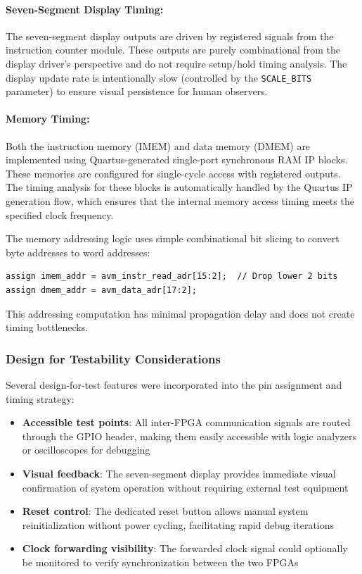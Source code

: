 \documentclass[12pt]{article}
\begin{document}
\paragraph{Seven-Segment Display Timing:}
The seven-segment display outputs are driven by registered signals from the instruction counter module. These outputs are purely combinational from the display driver's perspective and do not require setup/hold timing analysis. The display update rate is intentionally slow (controlled by the \texttt{SCALE\_BITS} parameter) to ensure visual persistence for human observers.

\paragraph{Memory Timing:}
Both the instruction memory (IMEM) and data memory (DMEM) are implemented using Quartus-generated single-port synchronous RAM IP blocks. These memories are configured for single-cycle access with registered outputs. The timing analysis for these blocks is automatically handled by the Quartus IP generation flow, which ensures that the internal memory access timing meets the specified clock frequency.

The memory addressing logic uses simple combinational bit slicing to convert byte addresses to word addresses:
\begin{verbatim}
assign imem_addr = avm_instr_read_adr[15:2];  // Drop lower 2 bits
assign dmem_addr = avm_data_adr[17:2];
\end{verbatim}

This addressing computation has minimal propagation delay and does not create timing bottlenecks.

\subsubsection{Design for Testability Considerations}

Several design-for-test features were incorporated into the pin assignment and timing strategy:

\begin{itemize}
    \item \textbf{Accessible test points}: All inter-FPGA communication signals are routed through the GPIO header, making them easily accessible with logic analyzers or oscilloscopes for debugging
    
    \item \textbf{Visual feedback}: The seven-segment display provides immediate visual confirmation of system operation without requiring external test equipment
    
    \item \textbf{Reset control}: The dedicated reset button allows manual system reinitialization without power cycling, facilitating rapid debug iterations
    
    \item \textbf{Clock forwarding visibility}: The forwarded clock signal could optionally be monitored to verify synchronization between the two FPGAs
\end{itemize}
\end{document}
